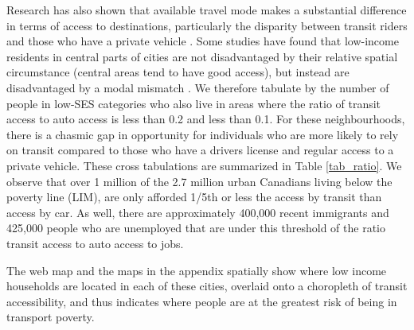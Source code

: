 \documentclass[11 pt, letterpaper]{article}
\begin{document}
{Research has also shown that available travel mode makes a substantial difference in terms of access to destinations, particularly the disparity between transit riders and those who have a private vehicle . Some studies have found that low-income residents in central parts of cities are not disadvantaged by their relative spatial circumstance (central areas tend to have good access), but instead are disadvantaged by a modal mismatch . We therefore tabulate by the number of people in low-SES categories who also live in areas where the ratio of transit access to auto access is less than 0.2 and less than 0.1. For these neighbourhoods, there is a chasmic gap in opportunity for individuals who are more likely to rely on transit compared to those who have a drivers license and regular access to a private vehicle. These cross tabulations are summarized in Table \ref{tab_ratio}. We observe that over 1 million of the 2.7 million urban Canadians living below the poverty line (LIM), are only afforded 1/5th or less the access by transit than access by car. As well, there are approximately 400,000 recent immigrants and 425,000 people who are unemployed that are under this threshold of the ratio transit access to auto access to jobs.

The web map and the maps in the appendix spatially show where low income households are located in each of these cities, overlaid onto a choropleth of transit accessibility, and thus indicates where people are at the greatest risk of being in transport poverty. 


}
\end{document}
